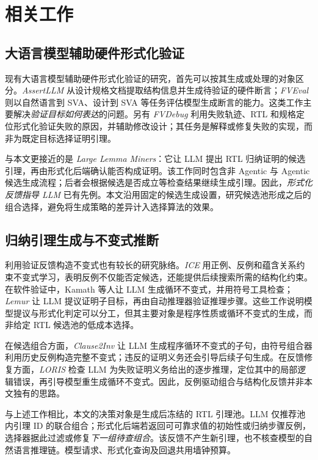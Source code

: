 \section{相关工作}

\subsection{大语言模型辅助硬件形式化验证}

现有大语言模型辅助硬件形式化验证的研究，首先可以按其生成或处理的对象区分。\emph{AssertLLM} 从设计规格文档提取结构信息并生成待验证的硬件断言\cite{fang2024assertllm}；\emph{FVEval} 则以自然语言到 SVA、设计到 SVA 等任务评估模型生成断言的能力\cite{kang2024fveval}。这类工作主要解决\emph{验证目标如何表达}的问题。另有 \emph{FVDebug} 利用失败轨迹、RTL 和规格定位形式化验证失败的原因，并辅助修改设计\cite{bai2025fvdebug}；其任务是解释或修复失败的实现，而非为既定目标选择证明引理。

与本文更接近的是 \emph{Large Lemma Miners}：它让 LLM 提出 RTL 归纳证明的候选引理，再由形式化后端确认能否构成证明\cite{peled2026large}。该工作同时包含非 Agentic 与 Agentic 候选生成流程；后者会根据候选是否成立等检查结果继续生成引理。因此，\emph{形式化反馈指导 LLM} 已有先例。本文沿用固定的候选生成设置，研究候选池形成之后的组合选择，避免将生成策略的差异计入选择算法的效果。

\subsection{归纳引理生成与不变式推断}

利用验证反馈构造不变式也有较长的研究脉络。\emph{ICE} 用正例、反例和蕴含关系约束不变式学习\cite{garg2014ice}，表明反例不仅能否定候选，还能提供后续搜索所需的结构化约束。在软件验证中，Kamath 等人让 LLM 生成循环不变式，并用符号工具检查\cite{kamath2023loop}；\emph{Lemur} 让 LLM 提议证明子目标，再由自动推理器验证推理步骤\cite{wu2024lemur}。这些工作说明模型提议与形式化判定可以分工，但其主要对象是程序性质或循环不变式的生成，而非给定 RTL 候选池的低成本选择。

在候选组合方面，\emph{Clause2Inv} 让 LLM 生成程序循环不变式的子句，由符号组合器利用历史反例构造完整不变式；违反的证明义务还会引导后续子句生成\cite{cao2025clause2inv}。在反馈修复方面，\emph{LORIS} 检查 LLM 为失败证明义务给出的逐步推理，定位其中的局部逻辑错误，再引导模型重生成循环不变式\cite{li2026loris}。因此，反例驱动组合与结构化反馈并非本文独有的思路。

与上述工作相比，本文的决策对象是生成后冻结的 RTL 引理池。LLM 仅推荐池内引理 ID 的联合组合；形式化后端若返回可可靠求值的初始性或归纳步骤反例，选择器据此过滤或修复\emph{下一组待查组合}。该反馈不产生新引理，也不核查模型的自然语言推理链。模型请求、形式化查询及回退共用墙钟预算。

